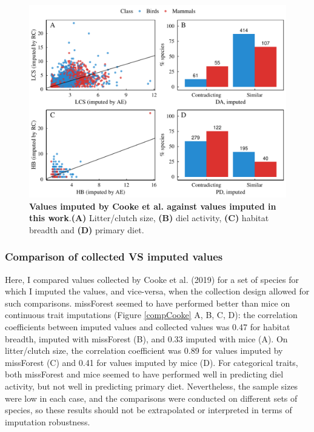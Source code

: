 \documentclass[11pt]{article}
\begin{document}
\begin{figure}[h!]
\centering
\includegraphics[scale=0.6]{figures/Comparison_Cooke/Comparison_imputed}
\caption[Values imputed by Cooke et al. against values imputed in this work]{\textbf{Values imputed by Cooke et al. against values imputed in this work}.\textbf{(A)} Litter/clutch size, \textbf{(B)} diel activity, \textbf{(C)} habitat breadth and \textbf{(D)} primary diet.}
\label{compCookeimp}
\end{figure}


\subsubsection{Comparison of collected VS imputed values}
Here, I compared values collected by Cooke et al. (2019) for a set of species for which I imputed the values, and vice-versa, when the collection design allowed for such comparisons. missForest seemed to have performed better than mice on continuous trait imputations (Figure \ref{compCooke} A, B, C, D): the correlation coefficients between imputed values and collected values was 0.47 for habitat breadth, imputed with missForest (B), and 0.33 imputed with mice (A).  On litter/clutch size, the correlation coefficient was 0.89 for values imputed by missForest (C) and 0.41 for values imputed by mice (D). For categorical traits, both missForest and mice seemed to have performed well in predicting diel activity, but not well in predicting primary diet. Nevertheless, the sample sizes were low in each case, and the comparisons were conducted on different sets of species, so these results should not be extrapolated or interpreted in terms of imputation robustness.
\end{document}
